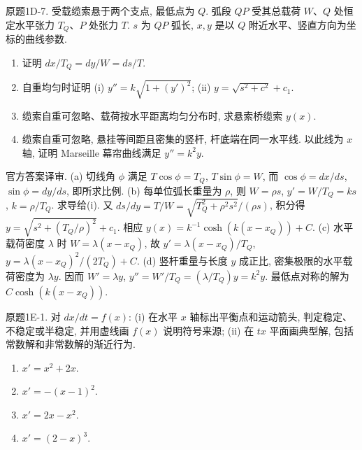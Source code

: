 \begin{exercise}\label{cw:bank-1D-7}
原题1D-7. 受载缆索悬于两个支点, 最低点为 $Q$. 弧段 $QP$ 受其总载荷 $W$、$Q$ 处恒定水平张力 $T_Q$、$P$ 处张力 $T$. $s$ 为 $QP$ 弧长, $x,y$ 是以 $Q$ 附近水平、竖直方向为坐标的曲线参数.
\begin{enumerate}[label=\alph*)]
\item 证明 $dx/T_Q=dy/W=ds/T$.
\item 自重均匀时证明 (i) $y''=k\sqrt{1+(y')^2}$; (ii) $y=\sqrt{s^2+c^2}+c_1$.
\item 缆索自重可忽略、载荷按水平距离均匀分布时, 求悬索桥缆索 $y(x)$.
\item 缆索自重可忽略, 悬挂等间距且密集的竖杆, 杆底端在同一水平线. 以此线为 $x$ 轴, 证明 Marseille 幕帘曲线满足 $y''=k^2y$.
\end{enumerate}
\end{exercise}
\begin{solution}
官方答案译审. (a) 切线角 $\phi$ 满足 $T\cos\phi=T_Q$, $T\sin\phi=W$, 而 $\cos\phi=dx/ds$, $\sin\phi=dy/ds$, 即所求比例. (b) 每单位弧长重量为 $\rho$, 则 $W=\rho s$, $y'=W/T_Q=ks$, $k=\rho/T_Q$. 求导给(i). 又 $ds/dy=T/W=\sqrt{T_Q^2+\rho^2s^2}/(\rho s)$, 积分得 $y=\sqrt{s^2+(T_Q/\rho)^2}+c_1$. 相应 $y(x)=k^{-1}\cosh(k(x-x_Q))+C$. (c) 水平载荷密度 $\lambda$ 时 $W=\lambda(x-x_Q)$, 故 $y'=\lambda(x-x_Q)/T_Q$, $y=\lambda(x-x_Q)^2/(2T_Q)+C$. (d) 竖杆重量与长度 $y$ 成正比, 密集极限的水平载荷密度为 $\lambda y$. 因而 $W'=\lambda y$, $y''=W'/T_Q=(\lambda/T_Q)y=k^2y$. 最低点对称的解为 $C\cosh(k(x-x_Q))$.
\end{solution}
\begin{exercise}\label{cw:bank-1E-1}
原题1E-1. 对 $dx/dt=f(x)$: (i) 在水平 $x$ 轴标出平衡点和运动箭头, 判定稳定、不稳定或半稳定, 并用虚线画 $f(x)$ 说明符号来源; (ii) 在 $tx$ 平面画典型解, 包括常数解和非常数解的渐近行为.
\begin{enumerate}[label=\alph*)]
\item $x'=x^2+2x$. \item $x'=-(x-1)^2$. \item $x'=2x-x^2$. \item $x'=(2-x)^3$.
\end{enumerate}
\end{exercise}
